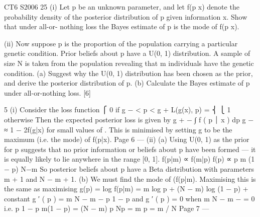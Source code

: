 \documentclass[a4paper,12pt]{article}
\begin{document}
 


CT6 S2006
25
(i) Let p be an unknown parameter, and let f(p x) denote the probability density of the posterior distribution of p given information x. Show that under all-or-
nothing loss the Bayes estimate of p is the mode of f(p x).

(ii) Now suppose p is the proportion of the population carrying a particular genetic condition. Prior beliefs about p have a U(0, 1) distribution. A sample of size
N is taken from the population revealing that m individuals have the genetic condition.
(a) Suggest why the U(0, 1) distribution has been chosen as the prior, and derive the posterior distribution of p.
(b) Calculate the Bayes estimate of p under all-or-nothing loss.
[6]


5
(i)
Consider the loss function
⎧ 0 if g − \varepsilon  < p < g + \varepsilon 
L(g(x), p) = ⎨
⎩ 1 otherwise
Then the expected posterior loss is given by
g + −
∫
f ( p ⏐ x ) dp
g −\varepsilon 
≈ 1 − 2\varepsilon f(g|x)
for small values of \varepsilon . This is minimised by setting g to be the maximum (i.e.
the mode) of f(p|x).
Page 6 — %
(ii)
(a)
Using U(0, 1) as the prior for p suggests that no prior information or
beliefs about p have been formed — it is equally likely to lie anywhere
in the range [0, 1].
f(p|m) ∝ f(m|p) f(p)
∝ p m (1 − p) N−m 
So posterior beliefs about p have a Beta distribution with parameters
m + 1 and N − m + 1.
(b)
We must find the mode of (f(p|m).
Maximising this is the same as maximising
g(p) = log f(p|m) = m log p + (N − m) log (1 − p) + constant
g ′ ( p ) =
m N − m
−
p 1 − p
and g ′ ( p ) = 0 when
m N − m
−
= 0 i.e.
p 1 − p
m(1 − p) = (N − m) p
Np = m
p = m / N
Page 7 — %
\end{document}
